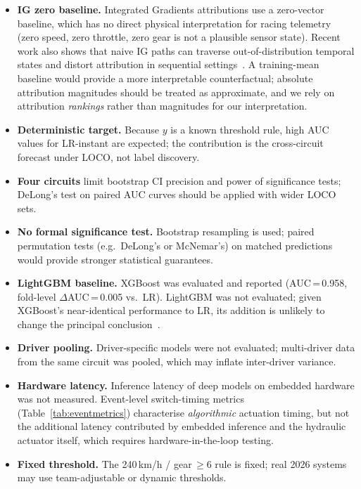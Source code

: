 \documentclass[conference,a4paper]{IEEEtran}
\begin{document}
\begin{itemize}
  \item \textbf{IG zero baseline.} Integrated Gradients attributions use a zero-vector
        baseline, which has no direct physical interpretation for racing telemetry
        (zero speed, zero throttle, zero gear is not a plausible sensor state).
        Recent work also shows that naive IG paths can traverse out-of-distribution
        temporal states and distort attribution in sequential settings~\cite{ref_timing}.
        A training-mean baseline would provide a more interpretable counterfactual;
        absolute attribution magnitudes should be treated as approximate, and we rely on
        attribution \emph{rankings} rather than magnitudes for our interpretation.

  \item \textbf{Deterministic target.} Because $y$ is a known threshold rule, high AUC
        values for LR-instant are expected; the contribution is the cross-circuit
        forecast under LOCO, not label discovery.

  \item \textbf{Four circuits} limit bootstrap CI precision and power of significance
        tests; DeLong's test on paired AUC curves should be applied with wider LOCO sets.

  \item \textbf{No formal significance test.} Bootstrap resampling is used; paired
        permutation tests (e.g.\ DeLong's or McNemar's) on matched predictions would
        provide stronger statistical guarantees.

  \item \textbf{LightGBM baseline.} XGBoost was evaluated and reported (AUC\,=\,0.958,
        fold-level $\Delta$AUC\,=\,0.005 vs.\ LR). LightGBM was not evaluated;
        given XGBoost's near-identical performance to LR, its addition is unlikely
        to change the principal conclusion~\cite{ref_grinsztajn}.

  \item \textbf{Driver pooling.} Driver-specific models were not evaluated; multi-driver
        data from the same circuit was pooled, which may inflate inter-driver variance.

  \item \textbf{Hardware latency.} Inference latency of deep models on embedded
        hardware was not measured. Event-level switch-timing metrics
        (Table~\ref{tab:eventmetrics}) characterise \emph{algorithmic} actuation
        timing, but not the additional latency contributed by embedded inference and
        the hydraulic actuator itself, which requires hardware-in-the-loop testing.

  \item \textbf{Fixed threshold.} The 240\,km/h / gear\,$\geq 6$ rule is fixed; real
        2026 systems may use team-adjustable or dynamic thresholds.
\end{itemize}
\end{document}
